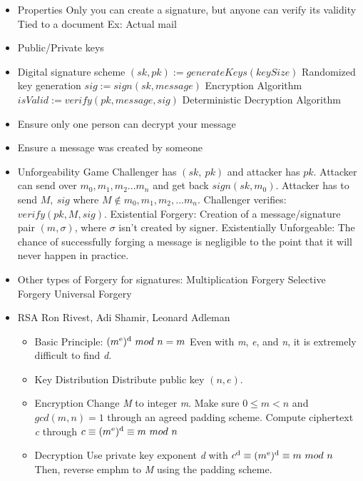 \documentclass{article}
\begin{document}
\begin{itemize}
  \item Properties
    \subitem Only you can create a signature, but anyone can verify its validity
    \subitem Tied to a document
    \subitem Ex: Actual mail
  \item Public/Private keys
  \item Digital signature scheme
    \subitem $ (sk, pk) := generateKeys(keySize) $ Randomized key generation
    \subitem $ sig := sign(sk, message) $ Encryption Algorithm
    \subitem $ isValid := verify(pk, message, sig) $ Deterministic Decryption Algorithm
  \item Ensure only one person can decrypt your message
  \item Ensure a message was created by someone
  \item Unforgeability Game
    \subitem Challenger has $ (sk,\ pk) $ and attacker has $ pk $.
    \subitem Attacker can send over $ m_0, m_1, m_2... m_n $ and get back $ sign(sk, m_0) $.
    \subitem Attacker has to send $ M,\ sig $ where $ M \notin {m_0, m_1, m_2, ...m_n} $.
    \subitem Challenger verifies: $ verify(pk, M, sig) $.
    \subitem Existential Forgery: Creation of a message/signature pair $(m, \sigma)$, where $\sigma$ isn't created by signer.
    \subitem Existentially Unforgeable: The chance of successfully forging a message is negligible to the point that
    it will never happen in practice.
  \item Other types of Forgery for signatures:
      \subitem Multiplication Forgery
      \subitem Selective Forgery
      \subitem Universal Forgery
  \item RSA
    \subitem Ron Rivest, Adi Shamir, Leonard Adleman
    \begin{itemize}
      \item Basic Principle: $ (m\textsuperscript{e})\textsuperscript{d}\ mod\ n = m $
        \subitem Even with \emph{m}, \emph{e}, and \emph{n}, it is extremely difficult to find \emph{d}.
      \item Key Distribution
        \subitem Distribute public key $ (n, e) $. 
      \item Encryption
        \subitem Change \emph{M} to integer \emph{m}. Make sure $ 0 \leq m < n $ and $ gcd(m, n) = 1 $ through an agreed padding scheme.
        \subitem Compute ciphertext \emph{c} through $ c \equiv (m\textsuperscript{e})\textsuperscript{d} \equiv m\ mod\ n $
      \item Decryption
        \subitem Use private key exponent \emph{d} with $ c\textsuperscript{d} \equiv (m\textsuperscript{e})\textsuperscript{d} \equiv m\ mod\ n $
        \subitem Then, reverse emph{m} to \emph{M} using the padding scheme.


\end{itemize}
\end{itemize}
\end{document}

